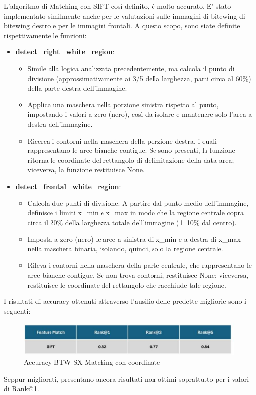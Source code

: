 \documentclass[12pt,a4paper,openright,twoside]{book}
\begin{document}
L'algoritmo di Matching con SIFT così definito, è molto accurato. E' stato implementato similmente anche per le valutazioni sulle immagini di bitewing di bitewing destro e per le immagini frontali. A questo scopo, sono state definite rispettivamente le funzioni:
\begin{itemize}
\item \textbf{detect\_right\_white\_region}:
\begin{itemize}
\item Simile alla logica analizzata precedentemente, ma calcola il punto di divisione (approssimativamente ai 3/5 della larghezza, parti circa al 60\%) della parte destra dell'immagine.
\item Applica una maschera nella porzione sinistra rispetto al punto, impostando i valori a zero (nero), così da isolare e mantenere solo l'area a destra dell'immagine.
\item Ricerca i contorni nella maschera della porzione destra, i quali rappresentano le aree bianche contigue. Se sono presenti, la funzione ritorna le coordinate del rettangolo di delimitazione della data area; viceversa, la funzione restituisce None.
\end{itemize}
\item \textbf{detect\_frontal\_white\_region}:
\begin{itemize}
\item Calcola due punti di divisione. A partire dal punto medio dell'immagine, definisce i limiti x\_min e x\_max in modo che la regione centrale copra circa il 20\% della larghezza totale dell'immagine (± 10\% dal centro).
\item Imposta a zero (nero) le aree a sinistra di x\_min e a destra di x\_max nella maschera binaria, isolando, quindi, solo la regione centrale.
\item Rileva i contorni nella maschera della parte centrale, che rappresentano le aree bianche contigue. Se non trova contorni, restituisce None; viceversa, restituisce le coordinate del rettangolo che racchiude tale regione.
\end{itemize}
\end{itemize}

I risultati di accuracy ottenuti attraverso l'ausilio delle predette migliorie sono i seguenti:
\begin{figure}[H]
	\centering
	\includegraphics{figures/sx8.pdf}
    	\caption{Accuracy BTW SX Matching con coordinate}
	\label{fig:sx8}
\end{figure}
Seppur migliorati, presentano ancora risultati non ottimi soprattutto per i valori di Rank@1.
\end{document}

